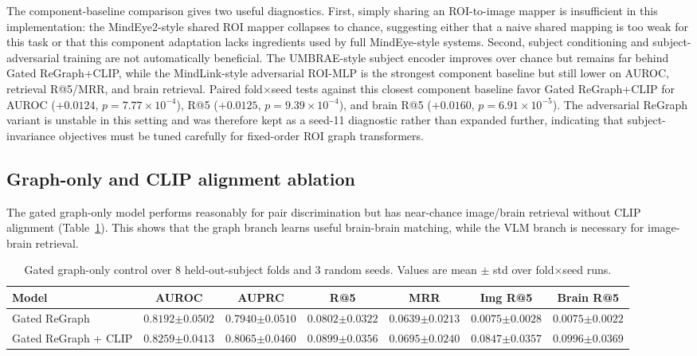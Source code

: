 \documentclass{article}
\begin{document}
The component-baseline comparison gives two useful diagnostics. First, simply sharing an ROI-to-image mapper is insufficient in this implementation: the MindEye2-style shared ROI mapper collapses to chance, suggesting either that a naive shared mapping is too weak for this task or that this component adaptation lacks ingredients used by full MindEye-style systems. Second, subject conditioning and subject-adversarial training are not automatically beneficial. The UMBRAE-style subject encoder improves over chance but remains far behind Gated ReGraph+CLIP, while the MindLink-style adversarial ROI-MLP is the strongest component baseline but still lower on AUROC, retrieval R@5/MRR, and brain retrieval. Paired fold$\times$seed tests against this closest component baseline favor Gated ReGraph+CLIP for AUROC ($+0.0124$, $p=7.77\times10^{-4}$), R@5 ($+0.0125$, $p=9.39\times10^{-4}$), and brain R@5 ($+0.0160$, $p=6.91\times10^{-5}$). The adversarial ReGraph variant is unstable in this setting and was therefore kept as a seed-11 diagnostic rather than expanded further, indicating that subject-invariance objectives must be tuned carefully for fixed-order ROI graph transformers.

\subsection{Graph-only and CLIP alignment ablation}

The gated graph-only model performs reasonably for pair discrimination but has near-chance image/brain retrieval without CLIP alignment (Table~\ref{tab:graph_only}). This shows that the graph branch learns useful brain-brain matching, while the VLM branch is necessary for image-brain retrieval.

\begin{table}[!htbp]
  \centering
  \caption{Gated graph-only control over 8 held-out-subject folds and 3 random seeds. Values are mean $\pm$ std over fold$\times$seed runs.}
  \label{tab:graph_only}
  \scriptsize
  \setlength{\tabcolsep}{3.5pt}
  \renewcommand{\arraystretch}{1.15}
  \begin{tabular}{lcccccc}
    \toprule
    Model & AUROC & AUPRC & R@5 & MRR & Img R@5 & Brain R@5 \\
    \midrule
    Gated ReGraph
    & $0.8192{\scriptstyle\pm0.0502}$
    & $0.7940{\scriptstyle\pm0.0510}$
    & $0.0802{\scriptstyle\pm0.0322}$
    & $0.0639{\scriptstyle\pm0.0213}$
    & $0.0075{\scriptstyle\pm0.0028}$
    & $0.0075{\scriptstyle\pm0.0022}$ \\
    Gated ReGraph + CLIP
    & $\mathbf{0.8259}{\scriptstyle\pm0.0413}$
    & $\mathbf{0.8065}{\scriptstyle\pm0.0460}$
    & $\mathbf{0.0899}{\scriptstyle\pm0.0356}$
    & $\mathbf{0.0695}{\scriptstyle\pm0.0240}$
    & $\mathbf{0.0847}{\scriptstyle\pm0.0357}$
    & $\mathbf{0.0996}{\scriptstyle\pm0.0369}$ \\
    \bottomrule
  \end{tabular}
\end{table}
\end{document}
